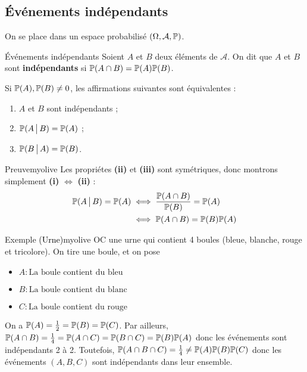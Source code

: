     \subsection{Événements indépendants}

    On se place dans un espace probabilisé $(\Omega, \mathcal{A}, \P)$.

    \begin{defi}{Événements indépendants}{}
        Soient $A$ et $B$ deux éléments de $\mathcal{A}$. On dit que $A$ et $B$ sont \textbf{indépendants} si $\P(A \cap B) = \P(A) \P(B)$.
    \end{defi}

    \begin{prop}{}{}
        Si $\P(A), \P(B) \neq 0$, les affirmations suivantes sont équivalentes : 
        \begin{enumerate}
            \item $A$ et $B$ sont indépendants ;
            \item $\P(A \vbar B) = \P(A)$ ;
            \item $\P(B \vbar A) = \P(B)$.
        \end{enumerate}
    \end{prop}

    \begin{demo}{Preuve}{myolive}
        Les propriétes \textbf{(ii)} et \textbf{(iii)} sont symétriques, donc montrons simplement \textbf{(i)} $\iff$ \textbf{(ii)} :
        \begin{align*}
            \P(A \vbar B) = \P(A) 
            &\iff \frac{\P(A \cap B)}{\P(B)} = \P(A) \\
            &\iff \P(A \cap B) = \P(B) \P(A)
        \end{align*}
    \end{demo}

    \begin{omed}{Exemple \textcolor{black}{(Urne)}}{myolive}
        OC une urne qui contient 4 boules (bleue, blanche, rouge et tricolore). On tire une boule, et on pose \begin{itemize}
            \item $A : \text{La boule contient du bleu}$
            \item $B : \text{La boule contient du blanc}$
            \item $C : \text{La boule contient du rouge}$
        \end{itemize}
        On a $\P(A) = \frac{1}{2} = \P(B) = \P(C)$. Par ailleurs, $\P(A \cap B) = \frac{1}{4} = \P(A \cap C) = \P(B \cap C) = \P(B)\P(A)$ donc les événements sont indépendants 2 à 2. Toutefois, $\P(A \cap B \cap C) = \frac{1}{4} \neq \P(A) \P(B) \P(C)$ donc les événements $(A,B,C)$ sont indépendants dans leur ensemble.
    \end{omed}


